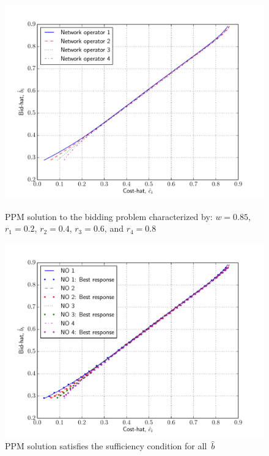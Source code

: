 \begin{figure}[p!]
  \includegraphics[width=\figsize]{Indirect/Figures/polynomial_projection_4}
  \caption{PPM solution to the bidding problem characterized by: $w=0.85$, $r_1 = 0.2$, $r_2 = 0.4$, $r_3 = 0.6$, and $r_4=0.8$}
  \label{fig:polynomial_projection_4_indirect}
  \vspace{10mm}
  \includegraphics[width=\figsize]{Indirect/Figures/polynomial_projection_4_sufficiency}
  \caption{PPM solution satisfies the sufficiency condition for all~$\hat{b}$}
  \label{fig:polynomial_projection_4_sufficiency_indirect}
\end{figure}

